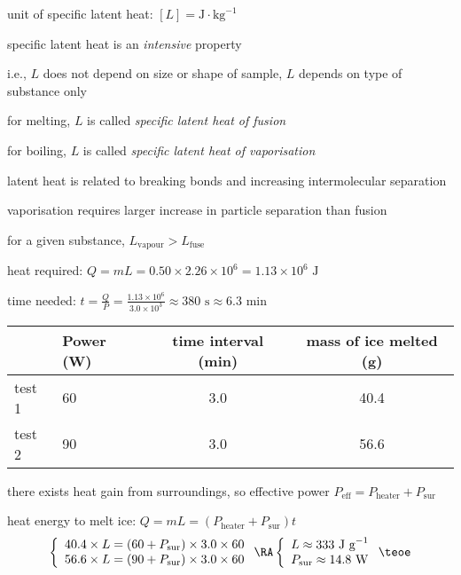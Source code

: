 \cmt unit of specific latent heat: $[L] = \text{J}\cdot\text{kg}^{-1}$

\cmt specific latent heat is an \emph{intensive} property

i.e., $L$ does not depend on size or shape of sample, $L$ depends on type of substance only 
	
\cmt for melting, $L$ is called \emph{specific latent heat of fusion}
	
for boiling, $L$ is called \emph{specific latent heat of vaporisation}
	
\cmt latent heat is related to breaking bonds and increasing intermolecular separation
	
vaporisation requires larger increase in particle separation than fusion
	
for a given substance, $L_\text{vapour}>L_\text{fuse}$


	
\sol heat required: $Q=mL = 0.50 \times 2.26 \times 10^6 = 1.13 \times 10^6 \text{ J}$
	
time needed: $t=\frac{Q}{P} = \frac{1.13 \times 10^6}{3.0\times 10^3} \approx 380 \text{ s} \approx 6.3 \text{ min}$ \eoe
 

\begin{center}
	\begin{tabular}{|C{1.6cm}|C{2cm}|c|c|}
		\hline  & Power (W) & time interval (min) & mass of ice melted (g) \\ 
		\hline test 1 & 60 & 3.0 & 40.4 \\ 
		\hline test 2 & 90 & 3.0 & 56.6 \\ 
		\hline 
	\end{tabular} 
\end{center}

\sol there exists heat gain from surroundings, so effective power $P_\text{eff}=P_\text{heater}+P_\text{sur}$

heat energy to melt ice: $Q = mL = (P_\text{heater}+P_\text{sur}) t$
\begin{equation*}
	\left\{ \begin{array}{l}
		40.4 \times L = (60+P_\text{sur})\times3.0\times60 \\
		56.6 \times L = (90+P_\text{sur})\times3.0\times60 
	\end{array}\right.
	\RA \left\{ \begin{array}{l}
	L \approx 333 \text{ J g}^{-1} \\
	P_\text{sur} \approx 14.8 \text{ W} \end{array}\right. \teoe
\end{equation*}

